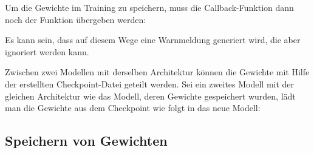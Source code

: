 






\medskip

Um die Gewichte im Training zu speichern, muss die Callback-Funktion dann
noch der Funktion  übergeben werden:

\medskip







\medskip

Es kann sein, dass auf diesem Wege eine Warnmeldung generiert wird, die aber ignoriert werden kann. 

\bigskip


Zwischen zwei Modellen mit derselben Architektur können die Gewichte mit Hilfe der erstellten Checkpoint-Datei geteilt werden. Sei  ein zweites Modell mit der gleichen Architektur wie das Modell, deren Gewichte gespeichert wurden,
lädt man die Gewichte aus dem Checkpoint wie folgt in das neue Modell:

\medskip


\medskip

\subsection{Speichern von Gewichten}

